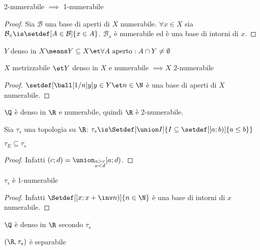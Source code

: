 
\begin{lemma}
2-numerabile $\implies$ 1-numerabile
\end{lemma}
\begin{proof}
Sia $\mathcal B$ una base di aperti di $X$ numerabile. $\forall x\in X$ sia $\mathcal B_x\is\setdef[A\in\mathcal B]{x\in A}$. $\mathcal B_x$ è numerabile ed è una base di intorni di $x$.
\end{proof}

\begin{defn}[Densità]
$Y$ denso in $X\means Y\subseteq X\et\forall A\text{ aperto}:A\cap Y\neq\emptyset$
\end{defn}

\begin{lemma}
$X$ metrizzabile $\et Y$ denso in $X$ e numerabile $\implies X$ 2-numerabile
\end{lemma}
\begin{proof}
$\setdef[{\ball[1/n]y}]{y\in Y\et n\in\N}$ è una base di aperti di $X$ numerabile.
\end{proof}

\begin{es}
$\Q$ è denso in $\R$ e numerabile, quindi $\R$ è 2-numerabile.
\end{es}

\begin{defn}
Sia $\tau_s$ una topologia su $\R$: $\tau_s\is\Setdef[\union I]{I\subseteq\setdef[[a;b)]{a\leq b}}$
\end{defn}

\begin{prop}
$\tau_E\subseteq\tau_s$
\end{prop}
\begin{proof}
Infatti $(c;d)=\union_{\substack{a>c\\a<d}}[a;d)$.
\end{proof}

\begin{prop}
$\tau_s$ è 1-numerabile
\end{prop}
\begin{proof}
Infatti $\Setdef[\left[x;x+\inv n\right)]{n\in\N}$ è una base di intorni di $x$ numerabile.
\end{proof}

\begin{prop}
$\Q$ è denso in $\R$ secondo $\tau_s$
\end{prop}

\begin{prop}
$(\R,\tau_s)$ è separabile
\end{prop}

